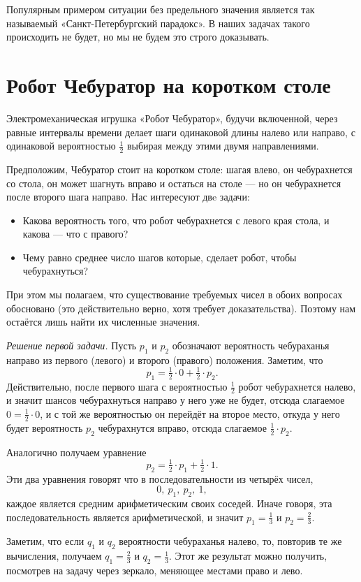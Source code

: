 \documentclass{article}
\begin{document}
Популярным примером ситуации без предельного значения является так называемый «Санкт-Петербургский парадокс». %
В наших задачах такого происходить не будет,
но мы не будем это строго доказывать.

\section{Робот Чебуратор на коротком столе} 

Электромеханическая игрушка «Робот Чебуратор», 
будучи включенной, через равные интервалы времени делает шаги одинаковой длины налево или направо, с одинаковой вероятностью $\tfrac12$ выбирая между этими двумя направлениями. 

Предположим, Чебуратор стоит на коротком столе:
шагая влево, он чебурахнется со стола,
он может шагнуть вправо и остаться на столе --- но он чебурахнется после второго шага направо.
Нас интересуют двe задачи:
\begin{itemize}
\item Какова вероятность того, что робот чебурахнется с левого края стола, и какова --- что с правого?
\item Чему равно среднее число шагов которые, сделает робот, чтобы чебурахнуться?
\end{itemize}
При этом мы полагаем, что существование требуемых чисел в обоих вопросах обосновано
(это действительно верно, хотя требует доказательства).
Поэтому нам остаётся лишь найти их
численные значения. 

\medskip
\noindent\textit{Решение первой задачи.}
Пусть $p_1$ и $p_2$ обозначают вероятность чебураханья направо из первого (левого) и второго (правого) положения. 
Заметим, что
\[p_1=\tfrac12\cdot0+\tfrac12\cdot p_2.\]
Действительно, после первого шага 
с вероятностью $\tfrac12$ робот чебурахнется налево,
и значит шансов чебурахнуться направо у него уже не будет, 
отсюда слагаемое $0=\tfrac12\cdot0$,
и с той же вероятностью он перейдёт на второе место,
откуда у него будет вероятность $p_2$ чебурахнутся вправо,
отсюда слагаемое $\tfrac12\cdot p_2$.

Аналогично получаем уравнение 
\[p_2=\tfrac12\cdot p_1+\tfrac12\cdot 1.\]
Эти два уравнения говорят что в последовательности из четырёх чисел, 
\[0,\  p_1,\  p_2,\ 1,\]
каждое является средним арифметическим своих соседей.
Иначе говоря, эта последовательность является арифметической, 
и значит $p_1=\tfrac13$ и $p_2=\tfrac23$.

Заметим, что если $q_1$ и $q_2$ вероятности чебураханья налево, 
то, повторив те же вычисления, получаем $q_1=\tfrac23$ и $q_2=\tfrac13$.
Этот же результат можно получить, посмотрев на задачу через зеркало, меняющее местами право и лево.
\end{document}
